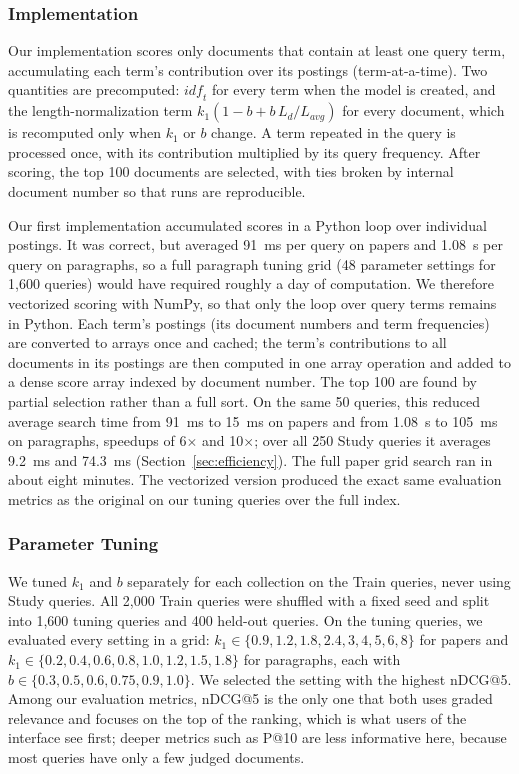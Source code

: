 \documentclass[sigconf,nonacm]{acmart}
\begin{document}
\subsubsection{Implementation}
Our implementation scores only documents that contain at least one query term,
accumulating each term's contribution over its postings (term-at-a-time). Two
quantities are precomputed: $\mathit{idf}_t$ for every term when the model is 
created, and the length-normalization term $k_1(1 - b + b\,L_d/L_{\mathit{avg}})$
for every document, which is recomputed only when $k_1$ or $b$ change. A term 
repeated in the query is processed once, with its contribution multiplied by its 
query frequency. After scoring, the top 100 documents are selected, with ties broken
by internal document number so that runs are reproducible.

Our first implementation accumulated scores in a Python loop over individual postings. 
It was correct, but averaged 91~ms per query on papers and 1.08~s per query on paragraphs, 
so a full paragraph tuning grid (48 parameter settings for 1,600 queries) would have required
roughly a day of computation. We therefore vectorized scoring with NumPy, so that only the 
loop over query terms remains in Python. Each term's postings (its document numbers and term 
frequencies) are converted to arrays once and cached; the term's contributions to all documents 
in its postings are then computed in one array operation and added to a dense score array indexed 
by document number. The top 100 are found by partial selection rather than a full sort. On the same 50 queries, 
this reduced average search time from 91~ms to 15~ms on papers and from 1.08~s to 105~ms on paragraphs, speedups of
6$\times$ and 10$\times$; over all 250 Study queries it averages 9.2~ms
and 74.3~ms (Section~\ref{sec:efficiency}). The full paper grid search ran in about eight minutes. The 
vectorized version produced the exact same evaluation metrics as the original on our tuning queries 
over the full index.

\subsubsection{Parameter Tuning}
We tuned $k_1$ and $b$ separately for each collection on the Train queries, never using 
Study queries. All 2,000 Train queries were shuffled with a fixed seed and split into 
1,600 tuning queries and 400 held-out queries. On the tuning queries, we evaluated every 
setting in a grid:
$k_1 \in \{0.9, 1.2, 1.8, 2.4, 3, 4, 5, 6, 8\}$ for papers and 
$k_1 \in \{0.2, 0.4, 0.6, 0.8, 1.0, 1.2, 1.5, 1.8\}$ for paragraphs, each with
$b \in \{0.3, 0.5, 0.6, 0.75, 0.9, 1.0\}$. We selected the setting with the highest nDCG@5.
Among our evaluation metrics, nDCG@5 is the only one that both uses graded relevance and focuses
on the top of the ranking, which is what users of the interface see first; deeper metrics such as
P@10 are less informative here, because most queries have only a few judged documents.
\end{document}
